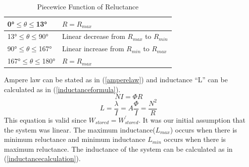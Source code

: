 \documentclass{article}
\begin{document}
	\begin{table}[h!]
		\centering
		\caption{Piecewice Function of Reluctance}
		\label{reluctancetable}
		\begin{tabular}{ll}
			\hline
			\ang{0}$\leq$$\theta$$\leq$\ang{13}	& $R=R_{max}$ \\ \hline
			\ang{13}$\leq$$\theta$$\leq$\ang{90}	&  Linear decrease from $R_{max}$ to $R_{min}$ \\ \hline
			\ang{90}$\leq$$\theta$$\leq$\ang{167}	& Linear increase from $R_{min}$ to $R_{max}$\\ \hline
			\ang{167}$\leq$$\theta$$\leq$\ang{180}	& $R=R_{max}$ \\ \hline
		\end{tabular}	
	\end{table}
Ampere law can be stated as in (\ref{amperelaw}) and inductance \enquote{L} can be calculated as in (\ref{inductanceformula}).
\begin{equation}
	NI=\Phi R 
	\label{amperelaw}
\end{equation}
\begin{equation}
L=\frac{\lambda}{I}=A\frac{\Phi}{I}=\frac{N^2}{R}
\label{inductanceformula}
\end{equation}
This equation is valid since $W_{stored}=W^{'}_{stored}$. It was our initial assumption that the system was linear. The maximum inductance($L_{max}$) occurs when there is minimum reluctance and minimum inductance $L_{min}$ occurs when there is maximum reluctance. The inductance of the system can be calculated as in (\ref{inductancecalculation}).
\end{document}
